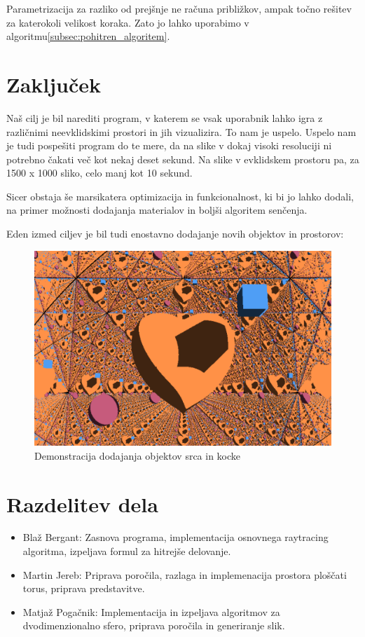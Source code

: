 \documentclass[titlepage]{article}
\begin{document}
Parametrizacija za razliko od prejšnje ne računa približkov, ampak točno rešitev za katerokoli velikost koraka. 
Zato jo lahko uporabimo v algoritmu\ref{subsec:pohitren_algoritem}.

\section{Zaključek}
Naš cilj je bil narediti program, v katerem se vsak uporabnik lahko igra z različnimi neevklidskimi
prostori in jih vizualizira. To nam je uspelo. Uspelo nam je tudi pospešiti program do te mere, da 
na slike v dokaj visoki resoluciji ni potrebno čakati več kot nekaj deset sekund. Na slike v evklidskem 
prostoru pa, za 1500 x 1000 sliko, celo manj kot 10 sekund.

Sicer obstaja še marsikatera optimizacija in funkcionalnost, ki bi jo lahko dodali,
na primer možnosti dodajanja materialov in boljši algoritem senčenja.

Eden izmed ciljev je bil tudi enostavno dodajanje novih objektov in prostorov:

\begin{figure} [H]
  \centering
  \includegraphics[width=0.9\linewidth]{Images/Flat_torus_24mm_heart_cube.png}
  \caption{Demonstracija dodajanja objektov srca in kocke}
  \label{fig:Flat_torus_heart}
\end{figure}



\section{Razdelitev dela}
\begin{itemize}
  \item Blaž Bergant: Zasnova programa, implementacija osnovnega raytracing algoritma, izpeljava formul za hitrejše delovanje.
  \item Martin Jereb: Priprava poročila, razlaga in implemenacija prostora ploščati torus, priprava predstavitve.
\item Matjaž Pogačnik: Implementacija in izpeljava algoritmov za dvodimenzionalno sfero, priprava poročila in generiranje slik.
\end{itemize}
\end{document}
